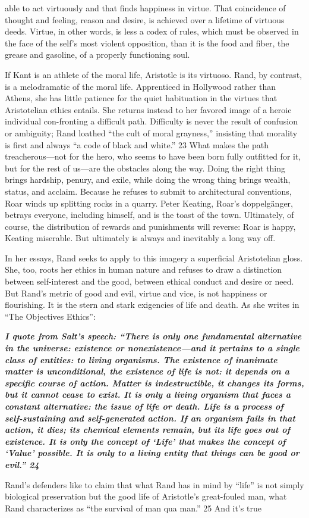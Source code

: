 able to act virtuously and that finds happiness in virtue. That coincidence of thought and feeling, reason and desire, is achieved over a lifetime of virtuous deeds. Virtue, in other words, is less a codex of rules, which must be observed in the face of the self's most violent opposition, than it is the food and fiber, the grease and gasoline, of a properly functioning soul.{\par} If Kant is an athlete of the moral life, Aristotle is its virtuoso. Rand, by contrast, is a melodramatic of the moral life. Apprenticed in Hollywood rather than Athens, she has little patience for the quiet habituation in the virtues that Aristotelian ethics entails. She returns instead to her favored image of a heroic individual con-fronting a difficult path. Difficulty is never the result of confusion or ambiguity; Rand loathed “the cult of moral grayness,” insisting that morality is first and always “a code of black and white.” {\color{blue} 23 } What makes the path treacherous—not for the hero, who seems to have been born fully outfitted for it, but for the rest of us—are the obstacles along the way. Doing the right thing brings hardship, penury, and exile, while doing the wrong thing brings wealth, status, and acclaim. Because he refuses to submit to architectural conventions, Roar winds up splitting rocks in a quarry. Peter Keating, Roar’s doppelgänger, betrays everyone, including himself, and is the toast of the town. Ultimately, of course, the distribution of rewards and punishments will reverse: Roar is happy, Keating miserable. But ultimately is always and inevitably a long way off.{\par} In her essays, Rand seeks to apply to this imagery a superficial Aristotelian gloss. She, too, roots her ethics in human nature and refuses to draw a distinction between self-interest and the good, between ethical conduct and desire or need. But Rand’s metric of good and evil, virtue and vice, is not happiness or flourishing. It is the stern and stark exigencies of life and death. As she writes in “The Objectives Ethics”:{\par} {\textbf{\textit{I quote from Salt’s speech: “There is only one fundamental alternative in the universe: existence or nonexistence—and it pertains to a single class of entities: to living organisms. The existence of inanimate matter is unconditional, the existence of life is not: it depends on a specific course of action. Matter is indestructible, it changes its forms, but it cannot cease to exist. It is only a living organism that faces a constant alternative: the issue of life or death. Life is a process of self-sustaining and self-generated action. If an organism fails in that action, it dies; its chemical elements remain, but its life goes out of existence. It is only the concept of ‘Life’ that makes the concept of ‘Value’ possible. It is only to a living entity that things can be good or evil.” {\color{blue} 24 } } } }{\par} Rand’s defenders like to claim that what Rand has in mind by “life” is not simply biological preservation but the good life of Aristotle’s great-fouled man, what Rand characterizes as “the survival of man qua man.” {\color{blue} 25 } And it’s true 